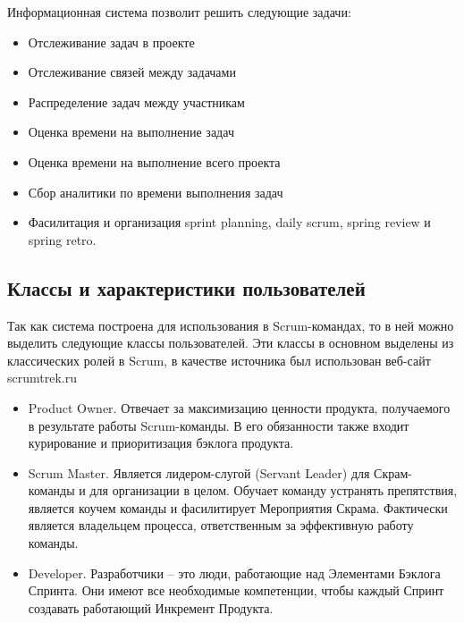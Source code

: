 Информационная система позволит решить следующие задачи:
\begin{itemize}
	\item Отслеживание задач в проекте
	\item Отслеживание связей между задачами
	\item Распределение задач между участникам
	\item Оценка времени на выполнение задач
	\item Оценка времени на выполнение всего проекта
	\item Сбор аналитики по времени выполнения задач
	\item Фасилитация и организация sprint planning, daily scrum, spring review и spring retro.
\end{itemize}

\subsection{Классы и характеристики пользователей}
Так как система построена для использования в Scrum-командах, то в ней
можно выделить следующие классы пользователей. Эти классы в основном выделены из
классических ролей в Scrum, в качестве источника был использован веб-сайт scrumtrek.ru
\begin{itemize}
	\item Product Owner. Отвечает за максимизацию ценности продукта, получаемого в результате работы Scrum-команды.
	      В его обязанности также входит курирование и приоритизация бэклога продукта.
	\item Scrum Master. Является лидером-слугой (Servant Leader) для Скрам-команды и для организации в целом.
	      Обучает команду устранять препятствия, является коучем команды и фасилитирует Мероприятия Скрама.
	      Фактически является владельцем процесса, ответственным за эффективную работу команды.
	\item Developer. Разработчики -- это люди, работающие над Элементами Бэклога Спринта.
	      Они имеют все необходимые компетенции, чтобы каждый Спринт создавать работающий Инкремент Продукта.
\end{itemize}


